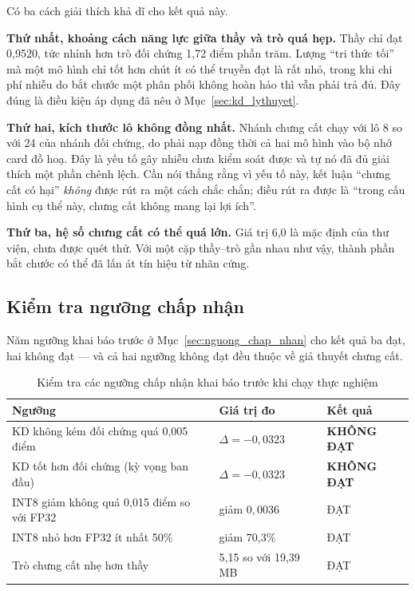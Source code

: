 Có ba cách giải thích khả dĩ cho kết quả này.

\textbf{Thứ nhất, khoảng cách năng lực giữa thầy và trò quá hẹp.} Thầy chỉ đạt 0,9520, tức nhỉnh
hơn trò đối chứng 1,72 điểm phần trăm. Lượng ``tri thức tối'' mà một mô hình chỉ tốt hơn chút ít có
thể truyền đạt là rất nhỏ, trong khi chi phí nhiễu do bắt chước một phân phối không hoàn hảo thì
vẫn phải trả đủ. Đây đúng là điều kiện áp dụng đã nêu ở Mục~\ref{sec:kd_lythuyet}.

\textbf{Thứ hai, kích thước lô không đồng nhất.} Nhánh chưng cất chạy với lô 8 so với 24 của nhánh
đối chứng, do phải nạp đồng thời cả hai mô hình vào bộ nhớ card đồ hoạ. Đây là yếu tố gây nhiễu
chưa kiểm soát được và tự nó đã đủ giải thích một phần chênh lệch. Cần nói thẳng rằng vì yếu tố này,
kết luận ``chưng cất có hại'' \emph{không} được rút ra một cách chắc chắn; điều rút ra được là
``trong cấu hình cụ thể này, chưng cất không mang lại lợi ích''.

\textbf{Thứ ba, hệ số chưng cất có thể quá lớn.} Giá trị 6,0 là mặc định của thư viện, chưa được
quét thử. Với một cặp thầy--trò gần nhau như vậy, thành phần bắt chước có thể đã lấn át tín hiệu từ
nhãn cứng.

\subsection{Kiểm tra ngưỡng chấp nhận}

Năm ngưỡng khai báo trước ở Mục~\ref{sec:nguong_chap_nhan} cho kết quả ba đạt, hai không đạt --- và
cả hai ngưỡng không đạt đều thuộc về giả thuyết chưng cất.

\begin{table}[H]
\centering
\caption{Kiểm tra các ngưỡng chấp nhận khai báo trước khi chạy thực nghiệm}
\label{tab:thresh}
\small
\begin{tabular}{lll}
\toprule
\textbf{Ngưỡng} & \textbf{Giá trị đo} & \textbf{Kết quả} \\
\midrule
KD không kém đối chứng quá 0,005 điểm     & $\Delta = -0{,}0323$ & \textbf{KHÔNG ĐẠT} \\
KD tốt hơn đối chứng (kỳ vọng ban đầu)    & $\Delta = -0{,}0323$ & \textbf{KHÔNG ĐẠT} \\
INT8 giảm không quá 0,015 điểm so với FP32 & giảm $0{,}0036$     & ĐẠT \\
INT8 nhỏ hơn FP32 ít nhất 50\%            & giảm 70,3\%          & ĐẠT \\
Trò chưng cất nhẹ hơn thầy                & 5,15 so với 19,39 MB & ĐẠT \\
\bottomrule
\end{tabular}
\end{table}

